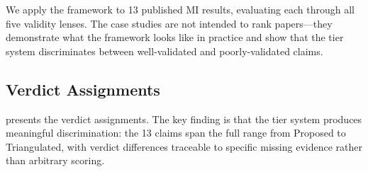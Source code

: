 \documentclass[10pt]{article}
\begin{document}
We apply the framework to 13 published MI results, evaluating each through all five validity lenses. The case studies are not intended to rank papers---they demonstrate what the framework looks like in practice and show that the tier system discriminates between well-validated and poorly-validated claims.

\subsection{Verdict Assignments}

 presents the verdict assignments. The key finding is that the tier system produces meaningful discrimination: the 13 claims span the full range from Proposed to Triangulated, with verdict differences traceable to specific missing evidence rather than arbitrary scoring.
\end{document}
